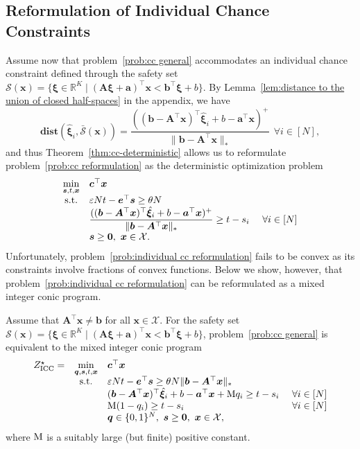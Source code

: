 \documentclass[nonblindrev]{informs2017}
\newcommand{\bmh}[1]{\hat{\bm{#1}}}
\newcommand{\1}[1]{\mathds{1}{\left(#1\right)}}
\begin{document}
\subsection{Reformulation of Individual Chance Constraints}\label{sec:ref_indiv_cc}
Assume now that problem~\eqref{prob:cc general} accommodates an individual chance constraint defined through the safety set $\mathcal{S}(\bm{x}) = \{\bm{\xi} \in \mathbb{R}^K \mid (\bm{A}\bm{\xi} + \bm{a})^\top \bm{x} < \bm{b}^\top\bm{\xi} + b\}$. By Lemma~\ref{lem:distance to the union of closed half-spaces} in the appendix, we have
$$\mathbf{dist}(\bmh{\xi}_i, \bar{\mathcal{S}}(\bm x)) = \dfrac{((\bm{b} - \bm{A}^\top\bm{x})^\top\bmh{\xi}_i + b - \bm{a}^\top\bm{x})^+}{\|\bm{b} - \bm{A}^\top\bm{x}\|_*} ~~\forall i \in [N],
$$
and thus Theorem~\ref{thm:cc-deterministic} allows us to reformulate problem~\eqref{prob:cc reformulation} as the deterministic optimization problem
\begin{equation}\label{prob:individual cc reformulation}
\begin{array}{cll}
\displaystyle \min_{\bm{s}, t, \bm{x}} & \bm{c}^\top\bm{x} \\
{\rm s.t.} & \varepsilon N t - \bm{e}^\top\bm{s} \geq \theta N \\
& \dfrac{((\bm{b} - \bm{A}^\top\bm{x})^\top\bmh{\xi}_i + b - \bm{a}^\top\bm{x})^+}{\|\bm{b} - \bm{A}^\top\bm{x}\|_*} \geq t - s_i &~\forall i \in [N] \\
& \bm{s} \geq \bm{0}, ~\bm{x} \in \mathcal{X}.
\end{array}
\end{equation}
Unfortunately, problem~\eqref{prob:individual cc reformulation} fails to be convex as its constraints involve fractions of convex functions. Below we show, however, that problem~\eqref{prob:individual cc reformulation} can be reformulated as a mixed integer conic program.  
\begin{proposition}\label{prop:individual cc}
Assume that $\bm{A}^\top\bm{x} \ne \bm{b}$ for all $\bm{x} \in \mathcal{X}$. For the safety set $\mathcal{S}(\bm{x}) = \{\bm{\xi} \in \mathbb{R}^K \mid (\bm{A}\bm{\xi} + \bm{a})^\top \bm{x} < \bm{b}^\top\bm{\xi} + b\}$, problem~\eqref{prob:cc general} is equivalent to the mixed integer conic program
\begin{equation}\label{prob:individual cc reformulation linearization}
\begin{array}{rcll}
Z^\star_{\rm ICC} =& \displaystyle \min_{\bm{q}, \bm{s}, t, \bm{x}} & \bm{c}^\top\bm{x} \\
&{\rm s.t.} & \varepsilon N t - \bm{e}^\top\bm{s} \geq \theta N \|\bm{b} - \bm{A}^\top\bm{x}\|_* \\
&& (\bm{b} - \bm{A}^\top\bm{x})^\top\bmh{\xi}_i + b - \bm{a}^\top\bm{x} + {\rm M} q_i \geq t - s_i &~\forall i \in [N] \\
&& {\rm M} (1 - q_i) \geq t - s_i &~\forall i \in [N] \\
&& \bm{q} \in \{0,1\}^N, ~\bm{s} \geq \bm{0}, ~\bm{x} \in \mathcal{X},
\end{array}
\end{equation}
where ${\rm M}$ is a suitably large (but finite) positive constant.
\end{proposition}
\end{document}
